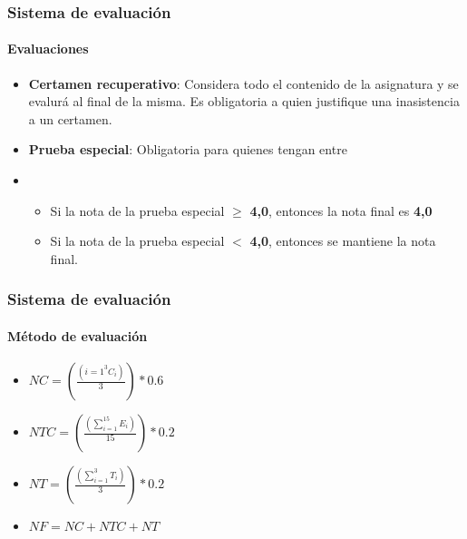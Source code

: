 \documentclass{beamer}
\begin{document}
		\begin{frame}
			\frametitle{Sistema de evaluaci\'on}
			\framesubtitle{Evaluaciones}
			\begin{itemize}
				\item \textbf{Certamen recuperativo}: Considera todo el contenido de la asignatura y se evalur\'a al final de la misma. Es obligatoria a quien justifique una inasistencia a un certamen.
				\item \textbf{Prueba especial}: Obligatoria para quienes tengan  entre \color{red}{3.5} \color{black}{y} \color{red}{3.9} \color{black}{en a lo menos uno de los tres items anteriores (Certamenes, Ejercicios o Tareas).}
				\item  \color{black}{En caso de rendir la prueba especial:}
				\begin{itemize}
    				\item Si la nota de la prueba especial $\geq$ \textbf{4,0}, entonces la nota final es \textbf{4,0}
	    			\item Si la nota de la prueba especial $<$ \textbf{4,0}, entonces se mantiene la nota final.
				\end{itemize}
			\end{itemize}
		\end{frame}

		\newpage
		\begin{frame}
			\frametitle{Sistema de evaluaci\'on}
			\framesubtitle{M\'etodo de evaluaci\'on}
			\begin{block}{}
				\begin{center}
					\begin{itemize}
  							\item$NC =(\displaystyle\frac{\left(\displaystyle{i=1}^{3}{C_{i}}\right)}{3})*0.6$ \\
								\item$NTC = (\displaystyle\frac{\left(\displaystyle\sum_{i=1}^{15}{E_{i}}\right)}{15})*0.2 $\\
  							\item$NT = (\displaystyle\frac{\left(\displaystyle\sum_{i=1}^{3}{T_{i}}\right)}{3})*0.2 $\\
								\item$NF = NC + NTC + NT  $\\
					\end{itemize}
				\end{center}
		\end{block}
	\end{frame}
\newpage
\end{document}

